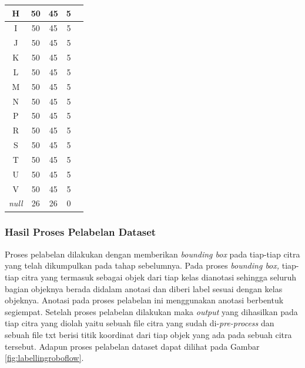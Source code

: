 \begin{center}
\begin{longtable}[c]{|c|c|c|c|c|}
  H             & 50           & 45           & 5           \\ \hline
  I             & 50           & 45           & 5           \\ \hline
  J             & 50           & 45           & 5           \\ \hline
  K             & 50           & 45           & 5           \\ \hline
  L             & 50           & 45           & 5           \\ \hline
  M             & 50           & 45           & 5           \\ \hline
  N             & 50           & 45           & 5           \\ \hline
  P             & 50           & 45           & 5           \\ \hline
  R             & 50           & 45           & 5           \\ \hline
  S             & 50           & 45           & 5           \\ \hline
  T             & 50           & 45           & 5           \\ \hline
  U             & 50           & 45           & 5           \\ \hline
  V             & 50           & 45           & 5           \\ \hline
  \textit{null} & 26           & 26           & 0           \\ \hline
  \end{longtable}
\end{center}
  
\subsubsection{Hasil Proses Pelabelan Dataset}
\label{subsubsec:hasilpelabelan}

Proses pelabelan dilakukan dengan memberikan \textit{bounding box} pada tiap-tiap citra yang telah dikumpulkan pada tahap sebelumnya. Pada proses \textit{bounding box,} tiap-tiap citra yang termasuk sebagai objek dari tiap kelas dianotasi sehingga seluruh bagian objeknya berada didalam anotasi dan diberi label sesuai dengan kelas objeknya. Anotasi pada proses pelabelan ini menggunakan anotasi berbentuk segiempat. Setelah proses pelabelan dilakukan maka \textit{output} yang dihasilkan pada tiap citra yang diolah yaitu sebuah file citra yang sudah di-\textit{pre-process} dan sebuah file txt berisi titik koordinat dari tiap objek yang ada pada sebuah citra tersebut. Adapun proses pelabelan dataset dapat dilihat pada Gambar \ref{fig:labellingroboflow}. 

